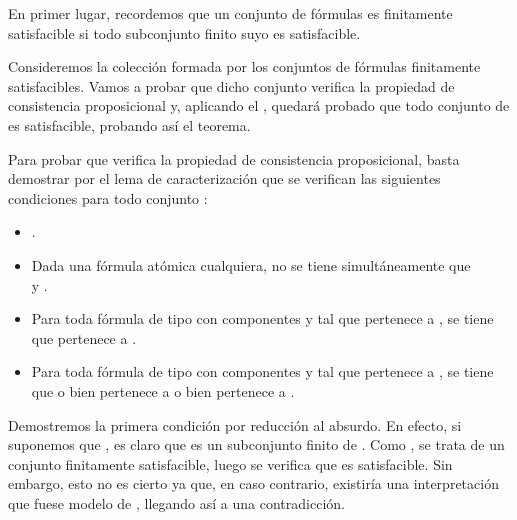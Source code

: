 \begin{isabellebody}
\begin{isamarkuptext}
  \begin{demostracion}
    En primer lugar, recordemos que un conjunto de fórmulas es finitamente satisfacible si todo
    subconjunto finito suyo es satisfacible.
  
    Consideremos la colección  formada por los conjuntos de fórmulas finitamente satisfacibles.
    Vamos a probar que dicho conjunto verifica la propiedad de consistencia proposicional y, 
    aplicando el , quedará probado que todo conjunto de  es
    satisfacible, probando así el teorema.

    Para probar que  verifica la propiedad de consistencia proposicional, basta demostrar por el 
    lema de caracterización  que se verifican las siguientes condiciones para todo 
    conjunto :
    \begin{itemize}
     \item {}.
     \item Dada  una fórmula atómica cualquiera, no se tiene 
      simultáneamente que\\  y .
     \item Para toda fórmula de tipo \isa{{\isasymalpha}} con componentes  y  tal que \isa{{\isasymalpha}}
      pertenece a , se tiene que  pertenece a .
     \item Para toda fórmula de tipo \isa{{\isasymbeta}} con componentes  y  tal que \isa{{\isasymbeta}}
      pertenece a , se tiene que o bien  pertenece a  o 
      bien  pertenece a .
    \end{itemize}

    Demostremos la primera condición por reducción al absurdo. En efecto, si suponemos que ,
    es claro que \isa{{\isacharbraceleft}{\isasymbottom}{\isacharbraceright}} es un subconjunto finito de . Como , se trata de un conjunto
    finitamente satisfacible, luego se verifica que \isa{{\isacharbraceleft}{\isasymbottom}{\isacharbraceright}} es satisfacible. Sin embargo, esto no es
    cierto ya que, en caso contrario, existiría una interpretación que fuese modelo de \isa{{\isasymbottom}}, 
    llegando así a una contradicción.


\end{demostracion}
\end{isamarkuptext}
\end{isabellebody}
